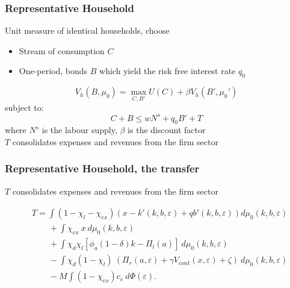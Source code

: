 \documentclass[aspectratio=169,xcolor=table]{beamer}
\begin{document}
\begin{frame}[label=Household] \frametitle{Representative Household \hfill \hyperlink{Model Summary}{}}

Unit measure of identical households, choose
\begin{itemize} \small
    \item Stream of consumption $C$ 
    \item One-period, bonds $B$ which yield the risk free interest rate $q_0$
\end{itemize} \normalsize

$$ V_h(B, \mu_0) = \max_{C,B'} U(C) + \beta V_h(B',\mu_0') $$
subject to: 
$$ C + B \leq w N^s + q_0 B' + T $$
where $N^s$ is the labour supply, $\beta$ is the discount factor \vspace{3mm} \\
$T$ consolidates expenses and revenues from the firm sector

\end{frame}

\begin{frame}[label=HH_T] \frametitle{Representative Household, the transfer \hfill \hyperlink{Lpayoff}{}}

$T$ consolidates expenses and revenues from the firm sector \vspace{-5mm} 

\begin{equation*} \label{eq:T}
    \begin{split}
        & T = \int (1 - \chi_l - \chi_{ex}) \left( x - k'(k,b,\varepsilon) + qb'(k,b,\varepsilon) \right) d \mu_0(k,b,\varepsilon) \\
        & \qquad + \int \chi_{ex} \ x \ d \mu_0(k,b,\varepsilon) \\
        & \qquad + \int \chi_d \chi_{l} [ \phi_a (1-\delta) k - \Pi_{l}(a)  ] \ d \mu_0(k,b,\varepsilon)  \\
        & \qquad  - \int \chi_d (1-\chi_{l}) \ (\Pi_r(a,\varepsilon) +  \gamma V_{cont} (x, \varepsilon) + \zeta) \ d \mu_0(k,b,\varepsilon) \\
        & \qquad - M \int (1-\chi_{ex}) c_e \ d \Phi(\varepsilon) .
    \end{split}
\end{equation*}

\end{frame}
\end{document}
